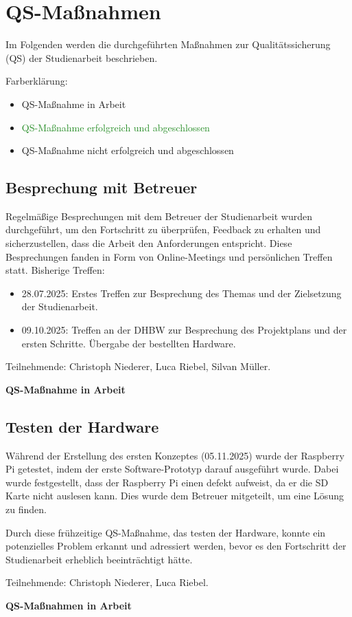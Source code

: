 \chapter{QS-Maßnahmen}
Im Folgenden werden die durchgeführten Maßnahmen zur Qualitätssicherung (QS) der Studienarbeit beschrieben.

Farberklärung:
\begin{itemize}
    \item {\textcolor{yellow!80!brown}{QS-Maßnahme in Arbeit}}
    \item {\textcolor{ForestGreen}{QS-Maßnahme erfolgreich und abgeschlossen}}
    \item {\textcolor{red!80!black}{QS-Maßnahme nicht erfolgreich und abgeschlossen}}
\end{itemize}
\section{Besprechung mit Betreuer}
Regelmäßige Besprechungen mit dem Betreuer der Studienarbeit wurden durchgeführt, um den Fortschritt zu überprüfen, Feedback zu erhalten und sicherzustellen, dass die Arbeit den Anforderungen entspricht. Diese Besprechungen fanden in Form von Online-Meetings und persönlichen Treffen statt.
Bisherige Treffen: 
\begin{itemize}
    \item 28.07.2025: Erstes Treffen zur Besprechung des Themas und der Zielsetzung der Studienarbeit.
    \item 09.10.2025: Treffen an der DHBW zur Besprechung des Projektplans und der ersten Schritte. Übergabe der bestellten Hardware.
\end{itemize}
Teilnehmende: Christoph Niederer, Luca Riebel, Silvan Müller.

\textcolor{yellow!80!brown}{\textbf{QS-Maßnahme in Arbeit}}
\section{Testen der Hardware}
Während der Erstellung des ersten Konzeptes (05.11.2025) wurde der Raspberry Pi getestet, indem der erste Software-Prototyp darauf ausgeführt wurde. Dabei wurde festgestellt, dass der Raspberry Pi einen defekt aufweist, da er die SD Karte nicht auslesen kann. Dies wurde dem Betreuer mitgeteilt, um eine Lösung zu finden.

Durch diese frühzeitige QS-Maßnahme, das testen der Hardware, konnte ein potenzielles Problem erkannt und adressiert werden, bevor es den Fortschritt der Studienarbeit erheblich beeinträchtigt hätte.

Teilnehmende: Christoph Niederer, Luca Riebel.

\textcolor{yellow!80!brown}{\textbf{QS-Maßnahmen in Arbeit}}

